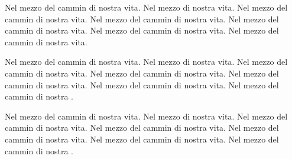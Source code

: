 \documentclass[b5paper]{book}
\begin{document}
\pstart
Nel mezzo del cammin di nostra vita. Nel mezzo  di nostra vita. Nel mezzo del cammin di nostra vita. Nel mezzo del cammin di nostra vita. Nel mezzo del cammin di nostra vita. Nel mezzo del cammin di nostra vita. Nel mezzo del cammin di nostra vita.
\pend

\pstart
Nel mezzo del cammin di nostra vita. Nel mezzo  di nostra vita. Nel mezzo del cammin di nostra vita. Nel mezzo del cammin di nostra vita. Nel mezzo del cammin di nostra vita. Nel mezzo del cammin di nostra vita. Nel mezzo del cammin di nostra .
\pend

\pstart
Nel mezzo del cammin di nostra vita. Nel mezzo  di nostra vita. Nel mezzo del cammin di nostra vita. Nel mezzo del cammin di nostra vita. Nel mezzo del cammin di nostra vita. Nel mezzo del cammin di nostra vita. Nel mezzo del cammin di nostra .
\pend
\endnumbering
\end{document}
